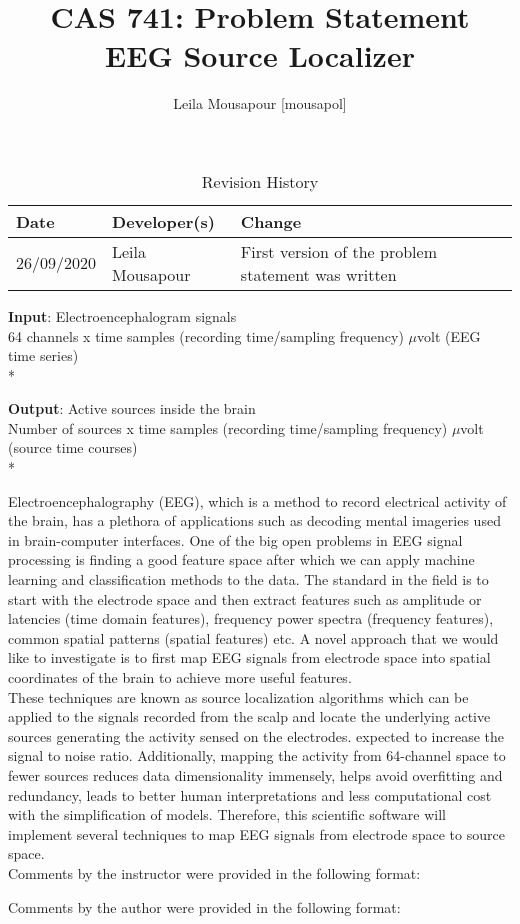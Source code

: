 \documentclass{article}
\title{CAS 741: Problem Statement\\EEG Source Localizer}
\author{Leila Mousapour [mousapol]}
\date{}
\begin{document}
\maketitle

\begin{table}[hp]
\caption{Revision History} \label{TblRevisionHistory}
\begin{tabularx}{\textwidth}{llX}
\toprule
\textbf{Date} & \textbf{Developer(s)} & \textbf{Change}\\
\midrule
26/09/2020 & Leila Mousapour & First version of the problem statement was written\\
\bottomrule
\end{tabularx}
\end{table}

\textbf{Input}: Electroencephalogram signals
\\
{\footnotesize 64 channels x time samples (recording time/sampling frequency) $\mu$volt (EEG time series)}
\\*

\textbf{Output}: Active sources inside the brain
\\
{\footnotesize Number of sources x time samples (recording time/sampling frequency)  $\mu$volt (source time courses)}
\\*

Electroencephalography (EEG), which is a method to record electrical activity of the brain, has a plethora of applications such as decoding mental imageries used in brain-computer interfaces. One of the big open problems in EEG signal processing is finding a good feature space after which we can apply machine learning and classification methods to the data. The standard in the field is to start with the electrode space and then extract features such as amplitude or latencies (time domain features), frequency power spectra (frequency features), common spatial patterns (spatial features) etc. A novel approach that we would like to investigate is to first map EEG signals from electrode space into spatial coordinates of the brain to achieve more useful features.
\\

These techniques are known as source localization algorithms which can be applied to the signals recorded from the scalp and locate the underlying active sources generating the activity sensed on the electrodes. expected to increase the signal to noise ratio. Additionally, mapping the activity from 64-channel space to fewer sources reduces data dimensionality immensely, helps avoid overfitting and redundancy, leads to better human interpretations and less computational cost with the simplification of models. Therefore, this scientific software will implement several techniques to map EEG signals from electrode space to source space.
\\

Comments by the instructor were provided in the following format:


Comments by the author were provided in the following format:

\end{document}

